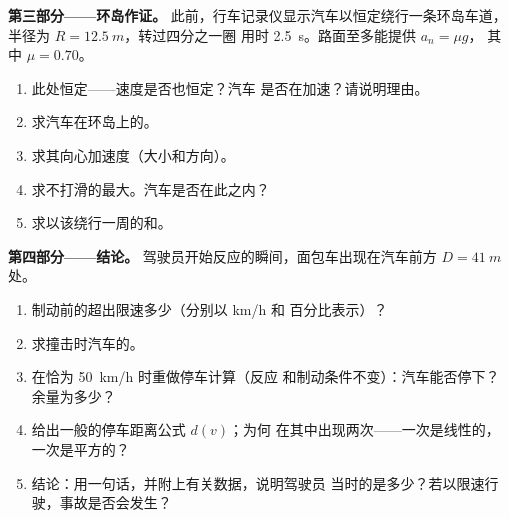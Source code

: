 \begin{problem}
\medskip
\noindent\textbf{第三部分——环岛作证。}
此前，行车记录仪显示汽车以恒定绕行一条环岛车道，
半径为 $R = \qty{12.5}{m}$，转过四分之一圈
用时 \qty{2.5}{s}。路面至多能提供 $a_n = \mu g$，
其中 $\mu = 0.70$。
\begin{enumerate}[resume]
  \item 此处恒定——速度是否也恒定？汽车
        是否在加速？请说明理由。
  \item 求汽车在环岛上的。
  \item 求其向心加速度（大小和方向）。
  \item 求不打滑的最大。汽车是否在此之内？
  \item 求以该绕行一周的和。
\end{enumerate}

\medskip
\noindent\textbf{第四部分——结论。}
驾驶员开始反应的瞬间，面包车出现在汽车前方
$D = \qty{41}{m}$ 处。
\begin{enumerate}[resume]
  \item 制动前的超出限速多少（分别以 \unit{km/h} 和
        百分比表示）？
  \item 求撞击时汽车的。
  \item 在恰为 \qty{50}{km/h} 时重做停车计算（反应
        和制动条件不变）：汽车能否停下？余量为多少？
  \item 给出一般的停车距离公式 $d(v)$；为何
        在其中出现两次——一次是线性的，一次是平方的？
  \item 结论：用一句话，并附上有关数据，说明驾驶员
        当时的是多少？若以限速行驶，事故是否会发生？
\end{enumerate}
\end{problem}

